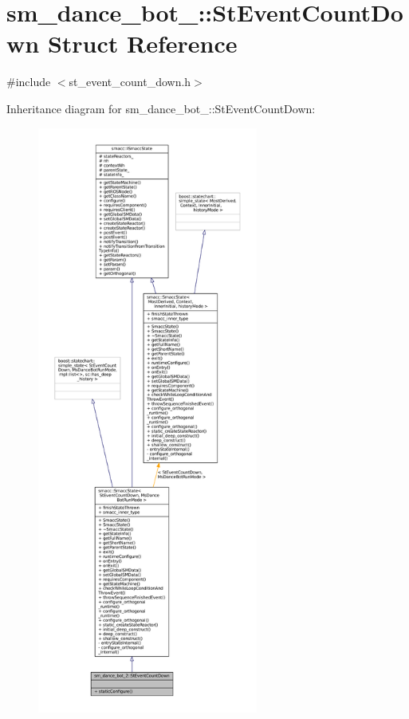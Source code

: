 \hypertarget{structsm__dance__bot__2_1_1StEventCountDown}{}\section{sm\+\_\+dance\+\_\+bot\+\_\+:\+:St\+Event\+Count\+Down Struct Reference}
\label{structsm__dance__bot__2_1_1StEventCountDown}


{\ttfamily \#include $<$st\+\_\+event\+\_\+count\+\_\+down.\+h$>$}



Inheritance diagram for sm\+\_\+dance\+\_\+bot\+\_\+:\+:St\+Event\+Count\+Down\+:
\nopagebreak
\begin{figure}[H]
\begin{center}
\leavevmode
\includegraphics[height=550pt]{structsm__dance__bot__2_1_1StEventCountDown__inherit__graph}
\end{center}
\end{figure}


